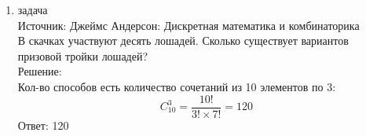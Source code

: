 \documentclass[a4paper,14pt]{extreport} %
\begin{document}
\begin{center}
\begin{enumerate}
						 \item {\large задача  }\\
						 Источник: Джеймс Андерсон: Дискретная математика и комбинаторика\\
						 \vspace{15pt}
						 В скачках участвуют десять лошадей. Сколько существует вариантов
						 призовой тройки лошадей?
						 \\
						 \vspace{15pt}
						 Решение:\\
						 Кол-во способов есть количество сочетаний из 10 элементов по 3:
						 \begin{equation}C_{10}^3 = \frac{10!}{3! \times 7! }= 120\end{equation}
						 Ответ: 120
						 
				\end{enumerate}
			\end{center}
			



	
	
\end{document}
